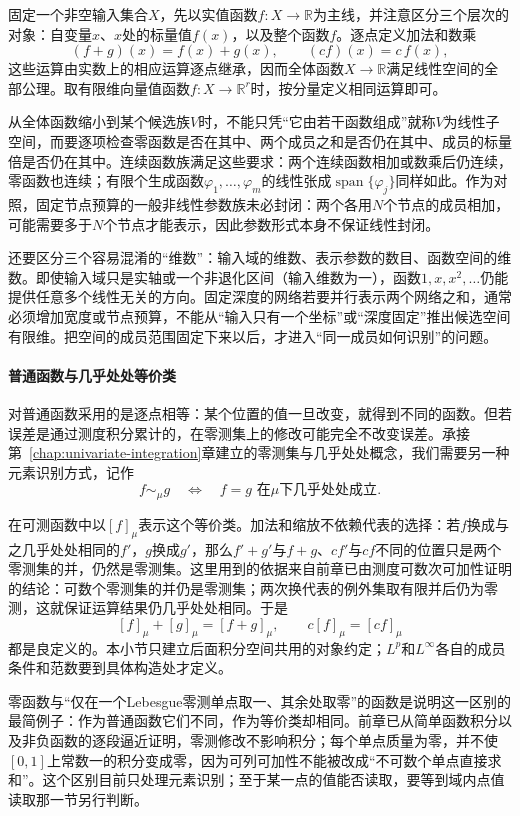 固定一个非空输入集合$X$，先以实值函数$f:X\to\mathbb R$为主线，并注意区分三个层次的对象：自变量$x$、$x$处的标量值$f(x)$，以及整个函数$f$。逐点定义加法和数乘
\[
  (f+g)(x)=f(x)+g(x),\qquad (cf)(x)=c\,f(x),
\]
这些运算由实数上的相应运算逐点继承，因而全体函数$X\to\mathbb R$满足线性空间的全部公理。取有限维向量值函数$f:X\to\mathbb R^r$时，按分量定义相同运算即可。

从全体函数缩小到某个候选族$V$时，不能只凭“它由若干函数组成”就称$V$为线性子空间，而要逐项检查零函数是否在其中、两个成员之和是否仍在其中、成员的标量倍是否仍在其中。连续函数族满足这些要求：两个连续函数相加或数乘后仍连续，零函数也连续；有限个生成函数$\varphi_1,\ldots,\varphi_m$的线性张成$\operatorname{span}\{\varphi_j\}$同样如此。作为对照，固定节点预算的一般非线性参数族未必封闭：两个各用$N$个节点的成员相加，可能需要多于$N$个节点才能表示，因此参数形式本身不保证线性封闭。

还要区分三个容易混淆的“维数”：输入域的维数、表示参数的数目、函数空间的维数。即使输入域只是实轴或一个非退化区间（输入维数为一），函数$1,x,x^2,\ldots$仍能提供任意多个线性无关的方向。固定深度的网络若要并行表示两个网络之和，通常必须增加宽度或节点预算，不能从“输入只有一个坐标”或“深度固定”推出候选空间有限维。把空间的成员范围固定下来以后，才进入“同一成员如何识别”的问题。

\paragraph{普通函数与几乎处处等价类}

对普通函数采用的是逐点相等：某个位置的值一旦改变，就得到不同的函数。但若误差是通过测度积分累计的，在零测集上的修改可能完全不改变误差。承接第~\ref{chap:univariate-integration}章建立的零测集与几乎处处概念，我们需要另一种元素识别方式，记作
\[
  f\sim_\mu g\quad\Longleftrightarrow\quad f=g\text{ 在$\mu$下几乎处处成立}.
\]

在可测函数中以$[f]_\mu$表示这个等价类。加法和缩放不依赖代表的选择：若$f$换成与之几乎处处相同的$f'$，$g$换成$g'$，那么$f'+g'$与$f+g$、$cf'$与$cf$不同的位置只是两个零测集的并，仍然是零测集。这里用到的依据来自前章已由测度可数次可加性证明的结论：可数个零测集的并仍是零测集；两次换代表的例外集取有限并后仍为零测，这就保证运算结果仍几乎处处相同。于是
\[
  [f]_\mu+[g]_\mu=[f+g]_\mu,\qquad c[f]_\mu=[cf]_\mu
\]
都是良定义的。本小节只建立后面积分空间共用的对象约定；$L^p$和$L^\infty$各自的成员条件和范数要到具体构造处才定义。

零函数与“仅在一个Lebesgue零测单点取一、其余处取零”的函数是说明这一区别的最简例子：作为普通函数它们不同，作为等价类却相同。前章已从简单函数积分以及非负函数的逐段逼近证明，零测修改不影响积分；每个单点质量为零，并不使$[0,1]$上常数一的积分变成零，因为可列可加性不能被改成“不可数个单点直接求和”。这个区别目前只处理元素识别；至于某一点的值能否读取，要等到域内点值读取那一节另行判断。

